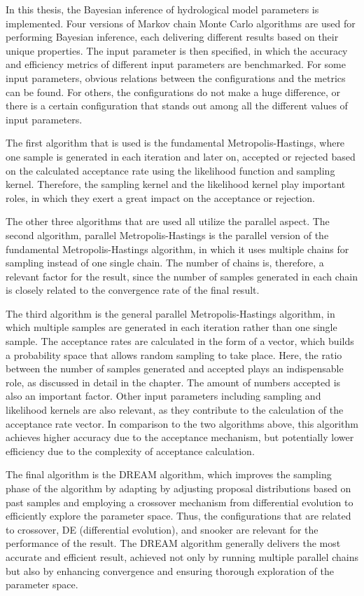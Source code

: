 In this thesis, the Bayesian inference of hydrological model parameters is implemented. Four versions of Markov chain Monte Carlo algorithms are used for performing Bayesian inference, each delivering different results based on their unique properties. The input parameter is then specified, in which the accuracy and efficiency metrics of different input parameters are benchmarked. For some input parameters, obvious relations between the configurations and the metrics can be found. For others, the configurations do not make a huge difference, or there is a certain configuration that stands out among all the different values of input parameters.

The first algorithm that is used is the fundamental Metropolis-Hastings, where one sample is generated in each iteration and later on, accepted or rejected based on the calculated acceptance rate using the likelihood function and sampling kernel. Therefore, the sampling kernel and the likelihood kernel play important roles, in which they exert a great impact on the acceptance or rejection.

The other three algorithms that are used all utilize the parallel aspect. The second algorithm, parallel Metropolis-Hastings is the parallel version of the fundamental Metropolis-Hastings algorithm, in which it uses multiple chains for sampling instead of one single chain. The number of chains is, therefore, a relevant factor for the result, since the number of samples generated in each chain is closely related to the convergence rate of the final result.

The third algorithm is the general parallel Metropolis-Hastings algorithm, in which multiple samples are generated in each iteration rather than one single sample. The acceptance rates are calculated in the form of a vector, which builds a probability space that allows random sampling to take place. Here, the ratio between the number of samples generated and accepted plays an indispensable role, as discussed in detail in the chapter. The amount of numbers accepted is also an important factor. Other input parameters including sampling and likelihood kernels are also relevant, as they contribute to the calculation of the acceptance rate vector. In comparison to the two algorithms above, this algorithm achieves higher accuracy due to the acceptance mechanism, but potentially lower efficiency due to the complexity of acceptance calculation.

The final algorithm is the DREAM algorithm, which improves the sampling phase of the algorithm by adapting by adjusting proposal distributions based on past samples and employing a crossover mechanism from differential evolution to efficiently explore the parameter space. Thus, the configurations that are related to crossover, DE (differential evolution), and snooker are relevant for the performance of the result. The DREAM algorithm generally delivers the most accurate and efficient result, achieved not only by running multiple parallel chains but also by enhancing convergence and ensuring thorough exploration of the parameter space.

